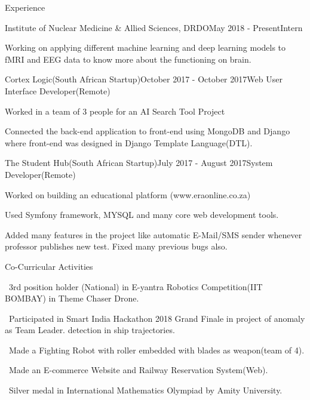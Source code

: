 \documentclass{resume} %
\begin{document}
\begin{rSection}{Experience}

\begin{rSubsection}{Institute of Nuclear Medicine \& Allied Sciences, DRDO}{May 2018 - Present}{Intern}{}
\item Working on applying different machine learning and deep learning models to fMRI and EEG data to know more about the functioning on brain.
\end{rSubsection}



\begin{rSubsection}{Cortex Logic(South African Startup)}{October 2017 - October 2017}{Web User Interface Developer(Remote)}{}
\item Worked in a team of 3 people for an AI Search Tool Project
\item Connected the back-end application to front-end using MongoDB and Django where front-end was designed in Django Template Language(DTL).
\end{rSubsection}


\begin{rSubsection}{The Student Hub(South African Startup)}{July 2017 - August 2017}{System Developer(Remote)}{}
	\item Worked on building an educational platform (www.eraonline.co.za)
	\item Used Symfony framework, MYSQL and many core web development tools.
	\item Added many features in the project like automatic E-Mail/SMS sender
	whenever professor publishes new test. Fixed many previous bugs also.
\\	
\end{rSubsection}

\end{rSection}


\begin{rSection}{Co-Curricular Activities} \itemsep -2pt
\item \textbullet \ 3rd position holder (National) in E-yantra Robotics Competition(IIT BOMBAY)
in Theme Chaser Drone.
\item \textbullet \ Participated in Smart India Hackathon 2018 Grand Finale in project of anomaly as Team Leader.
detection in ship trajectories.
\item \textbullet \ Made a Fighting Robot with roller embedded with blades as weapon(team of 4).
\item \textbullet \ Made an E-commerce Website and Railway Reservation System(Web).
\item \textbullet \ Silver medal in International Mathematics Olympiad by Amity University.
\end{rSection}
\end{document}
